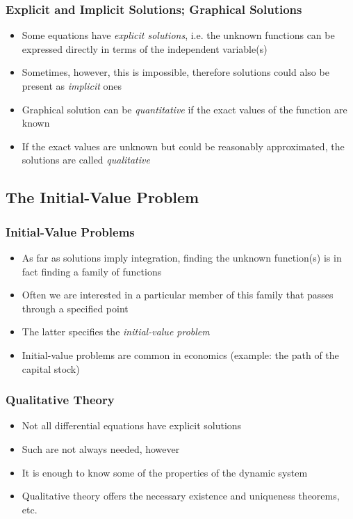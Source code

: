 \documentclass[10pt,usenames,dvipsnames]{beamer}
\theoremstyle{definition}
\begin{document}
\begin{frame}[fragile]
\frametitle{Explicit and Implicit Solutions; Graphical Solutions}
\begin{itemize}
	\item Some equations have \textit{explicit solutions}, i.e. the unknown functions can be expressed directly in terms of the independent variable(s)
	\item Sometimes, however, this is impossible, therefore solutions could also be present as \textit{implicit} ones
	\item Graphical solution can be \textit{quantitative} if the exact values of the function are known
	\item If the exact values are unknown but could be reasonably approximated, the solutions are called \textit{qualitative}
\end{itemize}
\end{frame}

\subsection{The Initial-Value Problem}
\begin{frame}[fragile]
\frametitle{Initial-Value Problems}
\begin{itemize}
	\item As far as solutions imply integration, finding the unknown function(s) is in fact finding a family of functions
	\item Often we are interested in a particular member of this family that passes through a specified point
	\item The latter specifies the \textit{initial-value problem}
	\item Initial-value problems are common in economics (example: the path of the capital stock)
\end{itemize}
\end{frame}

\begin{frame}[fragile]
\frametitle{Qualitative Theory}
\begin{itemize}
	\item Not all differential equations have explicit solutions
	\item Such are not always needed, however
	\item It is enough to know some of the properties of the dynamic system
	\item Qualitative theory offers the necessary existence and uniqueness theorems, etc.
\end{itemize}
\end{frame}
\end{document}
